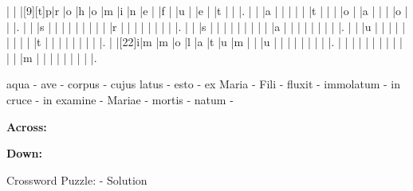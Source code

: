 \documentclass[12pt]{article}
\begin{document}
\begin{Puzzle}{22}{24}
  |{}  |{}  |[9][t]p|r   |o   |h   |o   |m   |i   |n   |e   |{}  |f   |{}  |u   |{}  |e   |{}  |t   |{}  |{}  |.
  |{}  |{}  |a   |{}  |{}  |{}  |{}  |{}  |t   |{}  |{}  |{}  |o   |{}  |a   |{}  |{}  |{}  |o   |{}  |{}  |.
  |{}  |{}  |s   |{}  |{}  |{}  |{}  |{}  |{}  |{}  |{}  |{}  |r   |{}  |{}  |{}  |{}  |{}  |{}  |{}  |{}  |.
  |{}  |{}  |s   |{}  |{}  |{}  |{}  |{}  |{}  |{}  |{}  |{}  |a   |{}  |{}  |{}  |{}  |{}  |{}  |{}  |{}  |.
  |{}  |{}  |u   |{}  |{}  |{}  |{}  |{}  |{}  |{}  |{}  |{}  |t   |{}  |{}  |{}  |{}  |{}  |{}  |{}  |{}  |.
  |{}  |[22]i|m   |m   |o   |l   |a   |t   |u   |m   |{}  |{}  |u   |{}  |{}  |{}  |{}  |{}  |{}  |{}  |{}  |.
  |{}  |{}  |{}  |{}  |{}  |{}  |{}  |{}  |{}  |{}  |{}  |{}  |m   |{}  |{}  |{}  |{}  |{}  |{}  |{}  |{}  |.
\end{Puzzle}
\begin{rotate}{90}
\small 
\qquad aqua - ave - corpus - cujus latus - esto - ex Maria - Fili - fluxit - immolatum - in cruce - in examine - Mariae - mortis - natum - 
\end{rotate}
\hspace{-10pt}
\begin{PuzzleClues}{\textbf{Across:}}
\end{PuzzleClues}
\begin{PuzzleClues}{\textbf{Down:}}
\end{PuzzleClues}
\newpage
\begin{center}
  \huge{Crossword Puzzle: - Solution}
\end{center}
\vspace{1.5cm}
\PuzzleSolution
\end{document}
